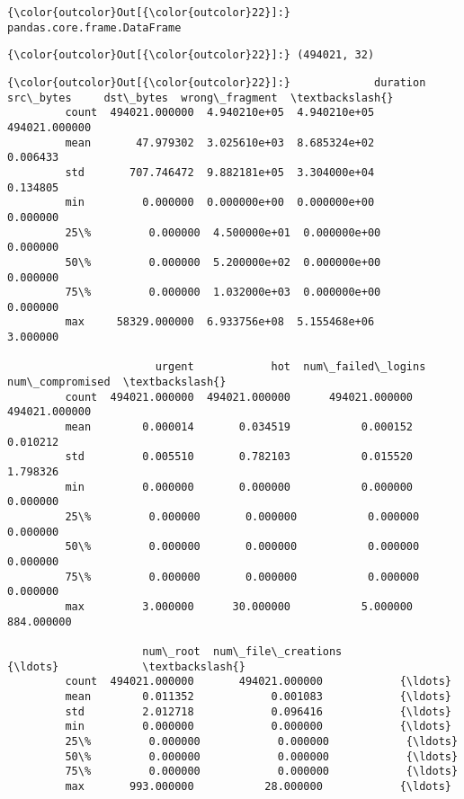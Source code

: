 \documentclass[11pt]{article}
\begin{document}
\begin{Verbatim}[commandchars=\\\{\}]
{\color{outcolor}Out[{\color{outcolor}22}]:} pandas.core.frame.DataFrame
\end{Verbatim}
            
\begin{Verbatim}[commandchars=\\\{\}]
{\color{outcolor}Out[{\color{outcolor}22}]:} (494021, 32)
\end{Verbatim}
            
\begin{Verbatim}[commandchars=\\\{\}]
{\color{outcolor}Out[{\color{outcolor}22}]:}             duration     src\_bytes     dst\_bytes  wrong\_fragment  \textbackslash{}
         count  494021.000000  4.940210e+05  4.940210e+05   494021.000000   
         mean       47.979302  3.025610e+03  8.685324e+02        0.006433   
         std       707.746472  9.882181e+05  3.304000e+04        0.134805   
         min         0.000000  0.000000e+00  0.000000e+00        0.000000   
         25\%         0.000000  4.500000e+01  0.000000e+00        0.000000   
         50\%         0.000000  5.200000e+02  0.000000e+00        0.000000   
         75\%         0.000000  1.032000e+03  0.000000e+00        0.000000   
         max     58329.000000  6.933756e+08  5.155468e+06        3.000000   
         
                       urgent            hot  num\_failed\_logins  num\_compromised  \textbackslash{}
         count  494021.000000  494021.000000      494021.000000    494021.000000   
         mean        0.000014       0.034519           0.000152         0.010212   
         std         0.005510       0.782103           0.015520         1.798326   
         min         0.000000       0.000000           0.000000         0.000000   
         25\%         0.000000       0.000000           0.000000         0.000000   
         50\%         0.000000       0.000000           0.000000         0.000000   
         75\%         0.000000       0.000000           0.000000         0.000000   
         max         3.000000      30.000000           5.000000       884.000000   
         
                     num\_root  num\_file\_creations            {\ldots}             \textbackslash{}
         count  494021.000000       494021.000000            {\ldots}              
         mean        0.011352            0.001083            {\ldots}              
         std         2.012718            0.096416            {\ldots}              
         min         0.000000            0.000000            {\ldots}              
         25\%         0.000000            0.000000            {\ldots}              
         50\%         0.000000            0.000000            {\ldots}              
         75\%         0.000000            0.000000            {\ldots}              
         max       993.000000           28.000000            {\ldots}              
         

\end{Verbatim}
\end{document}
